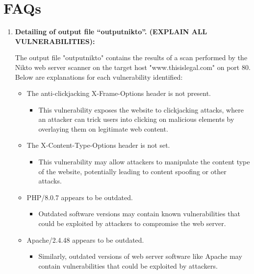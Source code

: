 \documentclass[11pt]{article}
\begin{document}
\section{FAQs}
\begin{enumerate}
    \item \textbf{Detailing of output file “outputnikto”. (EXPLAIN ALL VULNERABILITIES):}

          The output file "outputnikto" contains the results of a scan performed by the Nikto web server scanner on the target host "www.thisislegal.com" on port 80. Below are explanations for each vulnerability identified:

          \begin{itemize}
              \item The anti-clickjacking X-Frame-Options header is not present.
                    \begin{itemize}
                        \item This vulnerability exposes the website to clickjacking attacks, where an attacker can trick users into clicking on malicious elements by overlaying them on legitimate web content.
                    \end{itemize}

              \item The X-Content-Type-Options header is not set.
                    \begin{itemize}
                        \item This vulnerability may allow attackers to manipulate the content type of the website, potentially leading to content spoofing or other attacks.
                    \end{itemize}

              \item PHP/8.0.7 appears to be outdated.
                    \begin{itemize}
                        \item Outdated software versions may contain known vulnerabilities that could be exploited by attackers to compromise the web server.
                    \end{itemize}

              \item Apache/2.4.48 appears to be outdated.
                    \begin{itemize}
                        \item Similarly, outdated versions of web server software like Apache may contain vulnerabilities that could be exploited by attackers.
                    \end{itemize}


\end{itemize}
\end{enumerate}
\end{document}
